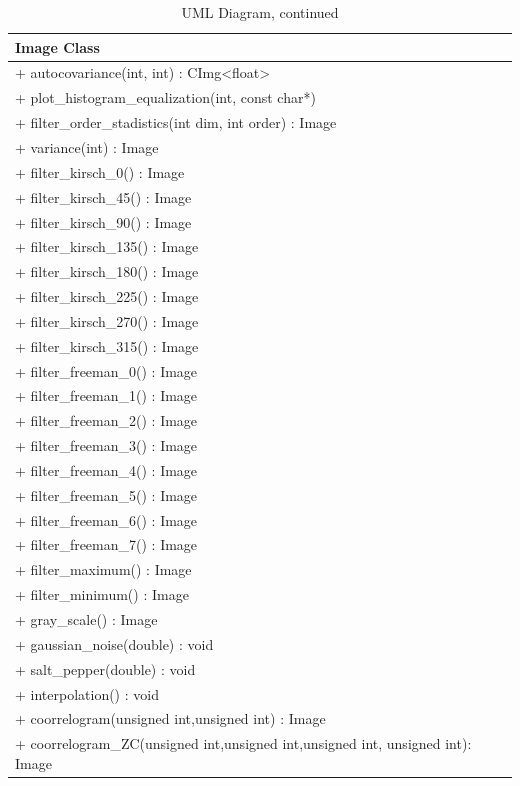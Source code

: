 \documentclass[a4paper]{article}
\begin{document}
\begin{table}[H]
	\label{UML2}
    \caption{UML Diagram, continued}
	\centering
    
	\begin{tabular}[15cm]{ 
    >{\arraybackslash}m{15cm}}
        \toprule 

		\large{Image Class} \\   

		\midrule
 		+ autocovariance(int, int) : CImg<float> \\
		+ plot\_histogram\_equalization(int, const char*) \\
        + filter\_order\_stadistics(int dim, int order) : Image \\
		+ variance(int) : Image \\
        + filter\_kirsch\_0() : Image \\
		+ filter\_kirsch\_45() : Image \\
        + filter\_kirsch\_90() : Image \\
        + filter\_kirsch\_135() : Image \\
        + filter\_kirsch\_180() : Image \\
        + filter\_kirsch\_225() : Image \\
        + filter\_kirsch\_270() : Image \\
        + filter\_kirsch\_315() : Image \\
        + filter\_freeman\_0() : Image \\
        + filter\_freeman\_1() : Image \\
        + filter\_freeman\_2() : Image \\
        + filter\_freeman\_3() : Image \\
        + filter\_freeman\_4() : Image \\
        + filter\_freeman\_5() : Image \\
        + filter\_freeman\_6() : Image \\
        + filter\_freeman\_7() : Image \\
        + filter\_maximum() : Image \\
        + filter\_minimum() : Image \\
        + gray\_scale() : Image \\
        + gaussian\_noise(double) : void \\
        + salt\_pepper(double) : void \\
        + interpolation() : void \\
		+ coorrelogram(unsigned int,unsigned int) : Image \\
		+ coorrelogram_ZC(unsigned int,unsigned int,unsigned int, unsigned int): Image \\
        \bottomrule
        
 
	\end{tabular}
    
\end{table}
\end{document}
